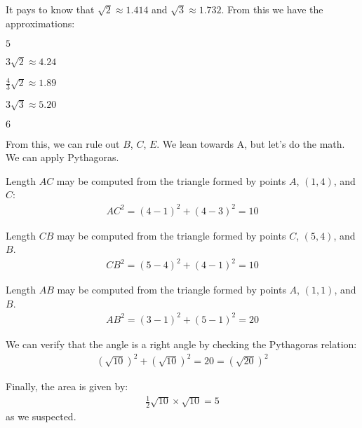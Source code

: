 \documentclass[12pt]{article}
\begin{document}
It pays to know that $\sqrt{2}\approx1.414$ and $\sqrt{3}\approx1.732$. From this we have the approximations: 
\begin{question}
\begin{enumerate*}
  \item $5$
  \item $3\sqrt{2}\approx 4.24$
  \item $\frac{4}{3}\sqrt{2} \approx 1.89$
  \item $3\sqrt{3} \approx 5.20$
  \item $6$
\end{enumerate*}
\end{question}
From this, we can rule out $B$, $C$, $E$. We lean towards A, but let's do the math. We can apply Pythagoras. 

Length $AC$ may be computed from the triangle formed by points $A$, $(1,4)$, and $C$:
\begin{align*}
AC^2 = (4-1)^2 + (4-3)^2 = 10
\end{align*}

Length $CB$ may be computed from the triangle formed by points $C$, $(5,4)$, and $B$.
\begin{align*}
CB^2 = (5-4)^2 + (4-1)^2 = 10
\end{align*}

Length $AB$ may be computed from the triangle formed by points $A$, $(1,1)$, and $B$.
\begin{align*}
AB^2 = (3-1)^2 + (5-1)^2 = 20
\end{align*}

We can verify that the angle is a right angle by checking the Pythagoras relation:
\begin{align*}
(\sqrt{10})^2 + (\sqrt{10})^2  = 20 = (\sqrt{20})^2 
\end{align*}

Finally, the area is given by:
\begin{align*}
\frac{1}{2} \sqrt{10} \times \sqrt{10}  = 5
\end{align*}
as we suspected. 




\newpage
\end{document}
